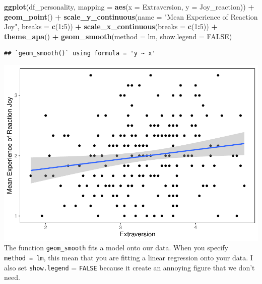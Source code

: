 \documentclass[
]{book}
\newenvironment{Shaded}{\begin{snugshade}}{\end{snugshade}}
\newcommand{\AttributeTok}[1]{\textcolor[rgb]{0.13,0.29,0.53}{#1}}
\newcommand{\ConstantTok}[1]{\textcolor[rgb]{0.56,0.35,0.01}{#1}}
\newcommand{\DecValTok}[1]{\textcolor[rgb]{0.00,0.00,0.81}{#1}}
\newcommand{\FunctionTok}[1]{\textcolor[rgb]{0.13,0.29,0.53}{\textbf{#1}}}
\newcommand{\NormalTok}[1]{#1}
\newcommand{\SpecialCharTok}[1]{\textcolor[rgb]{0.81,0.36,0.00}{\textbf{#1}}}
\newcommand{\StringTok}[1]{\textcolor[rgb]{0.31,0.60,0.02}{#1}}
\begin{document}
\begin{Shaded}
\begin{Highlighting}[]
\FunctionTok{ggplot}\NormalTok{(df\_personality, }\AttributeTok{mapping =} \FunctionTok{aes}\NormalTok{(}\AttributeTok{x =}\NormalTok{ Extraversion, }\AttributeTok{y =}\NormalTok{ Joy\_reaction)) }\SpecialCharTok{+}
  \FunctionTok{geom\_point}\NormalTok{() }\SpecialCharTok{+}
  \FunctionTok{scale\_y\_continuous}\NormalTok{(}\AttributeTok{name =} \StringTok{"Mean Experience of Reaction Joy"}\NormalTok{, }\AttributeTok{breaks =} \FunctionTok{c}\NormalTok{(}\DecValTok{1}\SpecialCharTok{:}\DecValTok{5}\NormalTok{)) }\SpecialCharTok{+}
  \FunctionTok{scale\_x\_continuous}\NormalTok{(}\AttributeTok{breaks =} \FunctionTok{c}\NormalTok{(}\DecValTok{1}\SpecialCharTok{:}\DecValTok{5}\NormalTok{)) }\SpecialCharTok{+}
  \FunctionTok{theme\_apa}\NormalTok{() }\SpecialCharTok{+}
  \FunctionTok{geom\_smooth}\NormalTok{(}\AttributeTok{method =}\NormalTok{ lm, }\AttributeTok{show.legend =} \ConstantTok{FALSE}\NormalTok{)}
\end{Highlighting}
\end{Shaded}

\begin{verbatim}
## `geom_smooth()` using formula = 'y ~ x'
\end{verbatim}

\includegraphics{rintro_demo_files/figure-latex/unnamed-chunk-311-1.pdf}
The function \texttt{geom\_smooth} fits a model onto our data. When you specify \texttt{method\ =\ lm}, this mean that you are fitting a linear regression onto your data. I also set \texttt{show.legend} = \texttt{FALSE} because it create an annoying figure that we don't need.
\end{document}
